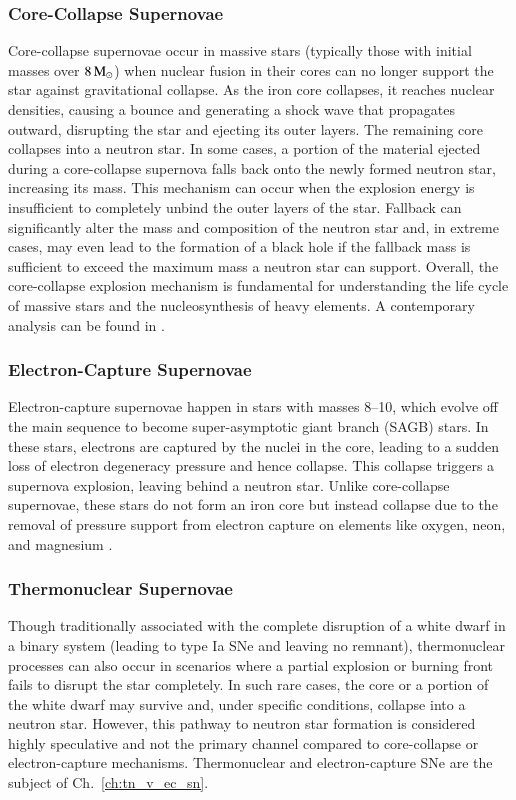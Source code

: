 \documentclass[main.tex]{subfiles}
\begin{document}
    \subsubsection{Core-Collapse Supernovae}
    Core-collapse supernovae occur in massive stars (typically those with initial masses over $8\mathrm{\,M_\odot}$) when nuclear fusion in their cores can no longer support the star against gravitational collapse. As the iron core collapses, it reaches nuclear densities, causing a bounce and generating a shock wave that propagates outward, disrupting the star and ejecting its outer layers. The remaining core collapses into a neutron star. In some cases, a portion of the material ejected during a core-collapse supernova falls back onto the newly formed neutron star, increasing its mass. This mechanism can occur when the explosion energy is insufficient to completely unbind the outer layers of the star. Fallback can significantly alter the mass and composition of the neutron star and, in extreme cases, may even lead to the formation of a black hole if the fallback mass is sufficient to exceed the maximum mass a neutron star can support. Overall, the core-collapse explosion mechanism is fundamental for understanding the life cycle of massive stars and the nucleosynthesis of heavy elements. A contemporary analysis can be found in \cite{2018ASSL..457....1C}.
    \subsubsection{Electron-Capture Supernovae}
    Electron-capture supernovae happen in stars with masses \numrange{8}{10}\msun, which evolve off the main sequence to become super-asymptotic giant branch (SAGB) stars. In these stars, electrons are captured by the nuclei in the core, leading to a sudden loss of electron degeneracy pressure and hence collapse. This collapse triggers a supernova explosion, leaving behind a neutron star. Unlike core-collapse supernovae, these stars do not form an iron core but instead collapse due to the removal of pressure support from electron capture on elements like oxygen, neon, and magnesium \citep[see also the discussion on O-Ne-Mg cores in Sect.~2.4 of][]{2018ASSL..457....1C}.
    \subsubsection{Thermonuclear Supernovae}
    Though traditionally associated with the complete disruption of a white dwarf in a binary system (leading to type Ia SNe and leaving no remnant), thermonuclear processes can also occur in scenarios where a partial explosion or burning front fails to disrupt the star completely. In such rare cases, the core or a portion of the white dwarf may survive and, under specific conditions, collapse into a neutron star. However, this pathway to neutron star formation is considered highly speculative and not the primary channel compared to core-collapse or electron-capture mechanisms. Thermonuclear and electron-capture SNe are the subject of Ch.~\ref{ch:tn_v_ec_sn}.
\end{document}

